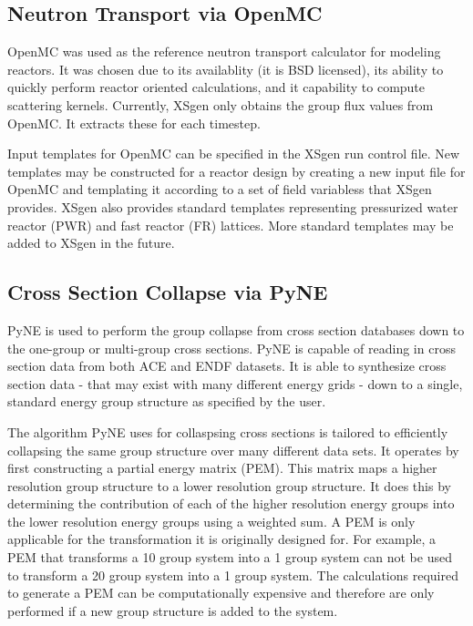 \documentclass{article}
\begin{document}
\subsection{Neutron Transport via OpenMC}

OpenMC was used as the reference neutron transport calculator for modeling reactors.
It was chosen due to its availablity (it is BSD licensed\cite{open3bsd}), its ability to quickly perform
reactor oriented calculations\cite{serpentvmonte}, and it capability to compute scattering
kernels. Currently, XSgen only obtains the group flux values from OpenMC. It extracts
these for each timestep.

Input templates for OpenMC can be specified in the XSgen run control file.
New templates may be constructed for a reactor design by creating a new input file for OpenMC
and templating it according to a set of field variabless that XSgen provides.
XSgen also provides standard templates representing pressurized water reactor (PWR)
and fast reactor (FR) lattices. More standard templates may be added to XSgen in the future.

\subsection{Cross Section Collapse via PyNE}

PyNE is used to perform the group collapse
from cross section databases down to the one-group or multi-group cross sections.
PyNE is capable of reading in cross section data from both ACE\cite{ace} and ENDF\cite{endf}
datasets. It is able to synthesize cross section data - that may exist with
many different energy grids - down to a single, standard energy group structure as specified
by the user.

The algorithm PyNE uses for collaspsing cross sections is tailored to efficiently collapsing
the same group structure over many different data sets.
It operates by first constructing a partial energy matrix (PEM). This matrix maps a higher
resolution group structure to a lower resolution group structure. It does this by determining
the contribution of each of the higher resolution energy groups into the lower resolution
energy groups using a weighted sum. A PEM is only applicable for the transformation it is
originally designed for. For example, a PEM that transforms a 10 group system into a
1 group system can not be used to transform a 20 group system into a 1 group system.
The calculations required to generate a PEM can be computationally expensive
and therefore are only performed if a new group structure is added to the system.
\end{document}
